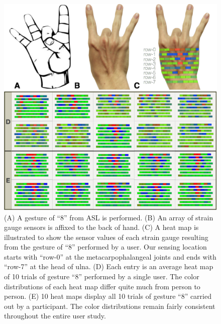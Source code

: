 \documentclass{sigchi}
\begin{document}
\begin{figure}
 \begin{center}
  \includegraphics[width=1\columnwidth]{figures/SVisual_v4.pdf}
  \caption{
    (A) A gesture of ``8'' from ASL is performed.
    (B) An array of strain gauge sensors is affixed to the back of hand.
    (C) A heat map is illustrated to show the sensor values of each strain gauge resulting from the gesture of ``8'' performed by a user. Our sensing location starts with ``row-0'' at the metacarpophalangeal joints and ends with ``row-7'' at the head of ulna.
    (D) Each entry is an average heat map of 10 trials of gesture ``8'' performed by a single user. The color distributions of each heat map differ quite much from person to person.
    (E) 10 heat maps display all 10 trials of gesture ``8'' carried out by a participant. The color distributions remain fairly consistent throughout the entire user study.
  }
  \label{fig:heatmapUsersV1}
  \end{center}
\end{figure}

\end{document}
